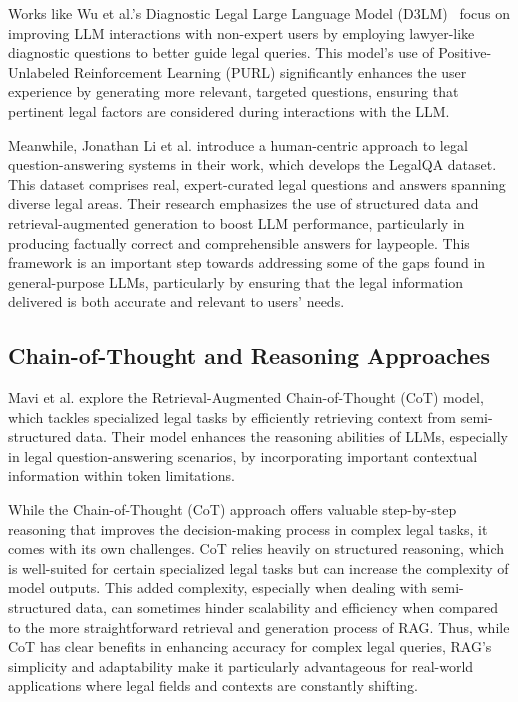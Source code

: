 Works like Wu et al.'s Diagnostic Legal Large Language Model 
(D3LM)~\cite{wu2024knowledgeinfusedlegalwisdomnavigating} focus on improving LLM 
interactions with non-expert users by employing lawyer-like diagnostic 
questions to better guide legal queries. This model's use of 
Positive-Unlabeled Reinforcement Learning (PURL) significantly 
enhances the user experience by generating more relevant, targeted questions, 
ensuring that pertinent legal factors are considered during interactions 
with the LLM.

Meanwhile, Jonathan Li et al. \cite{li2024experimentinglegalaisolutions} 
introduce a human-centric approach to legal question-answering systems in 
their work, which develops the LegalQA dataset. This dataset comprises real, 
expert-curated legal questions and answers spanning diverse legal areas. 
Their research emphasizes the use of structured data and retrieval-augmented 
generation to boost LLM performance, particularly in producing factually 
correct and comprehensible answers for laypeople. This framework is an 
important step towards addressing some of the gaps found in general-purpose LLMs, 
particularly by ensuring that the legal information delivered is both accurate and 
relevant to users' needs.

\subsection{Chain-of-Thought and Reasoning Approaches}
Mavi et al. \cite{mavi2023retrievalaugmentedchainofthoughtsemistructureddomains} 
explore the Retrieval-Augmented Chain-of-Thought (CoT) model, which tackles specialized 
legal tasks by efficiently retrieving context from semi-structured data. Their model 
enhances the reasoning abilities of LLMs, especially in legal question-answering 
scenarios, by incorporating important contextual information within token limitations.

While the Chain-of-Thought (CoT) approach offers valuable step-by-step reasoning that 
improves the decision-making process in complex legal tasks, it comes with its own challenges. 
CoT relies heavily on structured reasoning, which is well-suited for certain specialized legal tasks 
but can increase the complexity of model outputs. This added complexity, especially when dealing with 
semi-structured data, can sometimes hinder scalability and efficiency when compared to the more straightforward 
retrieval and generation process of RAG. Thus, while CoT has clear benefits in enhancing accuracy for complex 
legal queries, RAG's simplicity and adaptability make it particularly advantageous for real-world applications 
where legal fields and contexts are constantly shifting.

